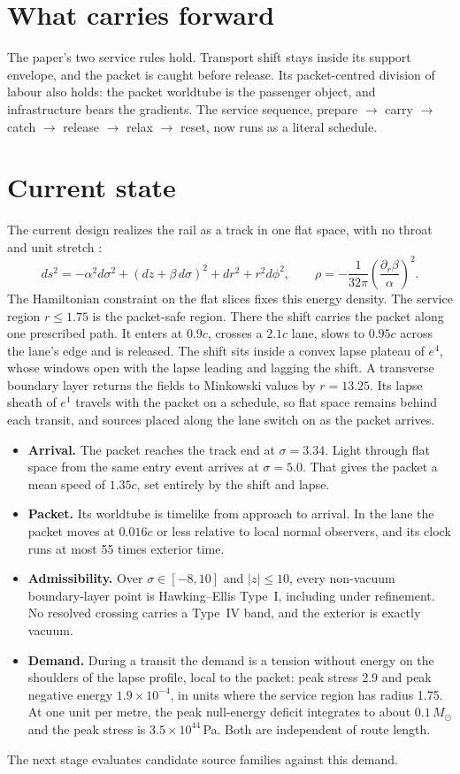 \documentclass[10pt]{article}
\begin{document}
\section{What carries forward}

The paper's two service rules hold. Transport shift stays inside its support envelope, and the packet is caught before
release. Its packet-centred division of labour also holds: the packet worldtube is the passenger object, and
infrastructure bears the gradients. The service sequence, prepare $\rightarrow$ carry $\rightarrow$ catch $\rightarrow$
release $\rightarrow$ relax $\rightarrow$ reset, now runs as a literal schedule.

\section{Current state}

The current design realizes the rail as a track in one flat space, with no throat and unit stretch \cite{repo}:
\[
ds^2=-\alpha^2d\sigma^2+(dz+\beta\,d\sigma)^2+dr^2+r^2d\phi^2,
\qquad
\rho=-\frac{1}{32\pi}\left(\frac{\partial_r\beta}{\alpha}\right)^2 .
\]
The Hamiltonian constraint on the flat slices fixes this energy density. The service region $r\le1.75$ is the
packet-safe region. There the shift carries the packet along one prescribed path. It enters at $0.9c$, crosses a $2.1c$
lane, slows to $0.95c$ across the lane's edge and is released. The shift sits inside a convex lapse plateau of $e^{4}$,
whose windows open with the lapse leading and lagging the shift. A transverse boundary layer returns the fields to
Minkowski values by $r=13.25$. Its lapse sheath of $e^{1}$ travels with the packet on a schedule, so flat space remains
behind each transit, and sources placed along the lane switch on as the packet arrives.
\begin{itemize}
\item \textbf{Arrival.} The packet reaches the track end at $\sigma=3.34$. Light through flat space from the same
entry event arrives at $\sigma=5.0$. That gives the packet a mean speed of $1.35c$, set entirely by the shift and lapse.
\item \textbf{Packet.} Its worldtube is timelike from approach to arrival. In the lane the packet moves at $0.016c$
or less relative to local normal observers, and its clock runs at most 55 times exterior time.
\item \textbf{Admissibility.} Over $\sigma\in[-8,10]$ and $|z|\le10$, every non-vacuum boundary-layer point is
Hawking--Ellis Type~I, including under refinement. No resolved crossing carries a Type~IV band, and the exterior is
exactly vacuum.
\item \textbf{Demand.} During a transit the demand is a tension without energy on the shoulders of the lapse profile,
local to the packet: peak stress 2.9 and peak negative energy $1.9\times10^{-4}$, in units where the service region has
radius 1.75. At one unit per metre, the peak null-energy deficit integrates to about $0.1\,M_\odot$ and the peak stress
is $3.5\times10^{44}$\,Pa. Both are independent of route length.
\end{itemize}
The next stage evaluates candidate source families against this demand.
\end{document}
